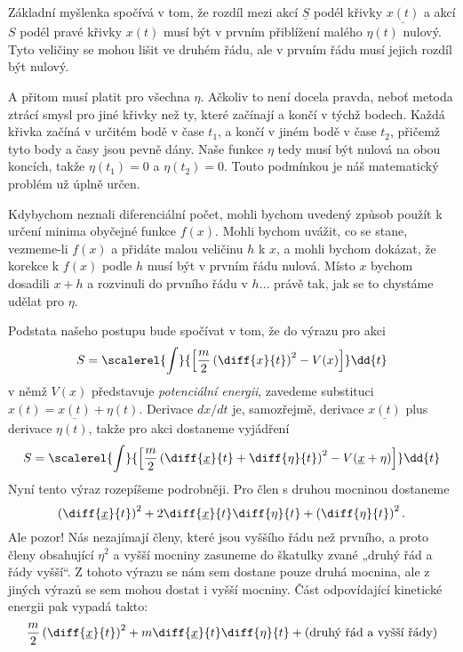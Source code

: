 
    Základní myšlenka spočívá v tom, že rozdíl mezi akcí \(\underline{S}\) podél křivky
    \(\underline{x(t)}\) a akcí \(S\) podél pravé křivky \(x(t)\) musí být v prvním přiblížení
    malého \(\eta(t)\) nulový. Tyto veličiny se mohou lišit ve druhém řádu, ale v prvním řádu musí
    jejich rozdíl být nulový.

    A přitom musí platit pro všechna \(\eta\). Ačkoliv to není docela pravda, neboť metoda ztrácí
    smysl pro jiné křivky než ty, které začínají a končí v týchž bodech. Každá křivka začíná v
    určitém bodě v čase \(t_1\), a končí v jiném bodě v čase \(t_2\), přičemž tyto body a časy jsou
    pevně dány. Naše funkce \(\eta\) tedy musí být nulová na obou koncích, takže \(\eta(t_1)=0\) a
    \(\eta(t_2)=0\). Touto podmínkou je náš matematický problém už úplně určen.

    Kdybychom neznali diferenciální počet, mohli bychom uvedený způsob použít k určení minima
    obyčejné funkce \(f(x)\). Mohli bychom uvážit, co se stane, vezmeme-li \(f(x)\) a přidáte malou
    veličinu \(h\) k \(x\), a mohli bychom dokázat, že korekce k \(f(x)\) podle \(h\) musí být v
    prvním řádu nulová. Místo \(x\) bychom dosadili \(x+h\) a rozvinuli do prvního řádu v
    \(h\ldots\) právě tak, jak se to chystáme udělat pro \(\eta\).

    Podstata našeho postupu bude spočívat v tom, že do výrazu pro akci
    \begin{equation*}
      S = \scalerel{\int}{\left[\frac{m}{2}\left(\diff{x}{t}\right)^2 - V(x) \right]}\dd{t}
    \end{equation*}
    v němž \(V(x)\) představuje \emph{potenciální energii}, zavedeme substituci \(x(t) =
    \underline{x(t)}+\eta(t)\). Derivace \(dx/dt\) je, samozřejmě, derivace \(\underline{x(t)}\)
    plus derivace \(\eta(t)\), takže pro akci dostaneme vyjádření
    \begin{equation*}
      S = \scalerel{\int}{\left[\frac{m}{2}\left(\diff{\underline{x}}{t}+\diff{\eta}{t}\right)^2 
          - V(\underline{x}+\eta)\right]}\dd{t}
    \end{equation*}
    Nyní tento výraz rozepíšeme podrobněji. Pro člen s druhou mocninou dostaneme
    \begin{equation*}
      \left(\diff{\underline{x}}{t}\right)^2 + 2\diff{\underline{x}}{t}\diff{\eta}{t} 
      + \left(\diff{\eta}{t}\right)^2.
    \end{equation*}
    Ale pozor! Nás nezajímají členy, které jsou vyššího řádu než prvního, a proto členy obsahující
    \(\eta^2\) a vyšší mocniny zasuneme do škatulky zvané „druhý řád a řády vyšší“. Z tohoto výrazu
    se nám sem dostane pouze druhá mocnina, ale z jiných výrazů se sem mohou dostat i vyšší mocniny.
    Část odpovídající kinetické energii pak vypadá takto:
    \begin{equation*}
      \dfrac{m}{2}\left(\diff{\underline{x}}{t}\right)^2 + m\diff{\underline{x}}{t}\diff{\eta}{t} + 
      (\text{druhý řád a vyšší řády})
    \end{equation*}

